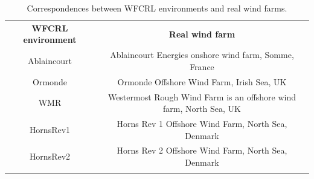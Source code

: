 \documentclass{article}
\begin{document}
%      
%      
%      
%      
%      
%      
%
\begin{table}
    \centering
    \begin{tabular}{c|c}
         \textbf{WFCRL environment} & \textbf{Real wind farm} \\
         Ablaincourt &  Ablaincourt Energies onshore wind farm, Somme, France \\
         Ormonde & Ormonde Offshore Wind Farm, Irish Sea, UK\\
         WMR & Westermost Rough Wind Farm is an offshore wind farm, North Sea, UK \\
         HornsRev1 & Horns Rev 1 Offshore Wind Farm, North Sea, Denmark\\
         HornsRev2 & Horns Rev 2 Offshore Wind Farm, North Sea, Denmark\\
         &\\
    \end{tabular}
    \caption{Correspondences between WFCRL environments and real wind farms.}
    \label{tab:wf-real}
    \vspace{-2em}
\end{table}
%
\end{document}

